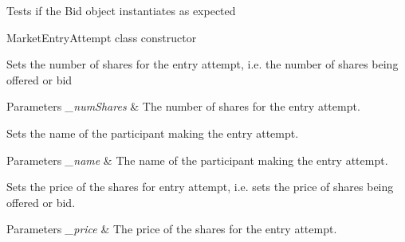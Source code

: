 
\begin{DoxyRefList}
\item[\label{todo__todo000005}%
\hypertarget{todo__todo000005}{}%
Member \hyperlink{class_bid_unit_test_a00b30251528b2203d6d9f17c321bc499}{Bid\+Unit\+Test.instantiation} ()]Tests if the Bid object instantiates as expected  
\item[\label{todo__todo000001}%
\hypertarget{todo__todo000001}{}%
Member \hyperlink{classfinancialmarketsimulator_1_1_market_entry_attempt_a9b2f8a9eef7975bc053907e2ea05c779}{financialmarketsimulator.Market\+Entry\+Attempt.Market\+Entry\+Attempt} (double pr, int num\+Shares, String name)]Market\+Entry\+Attempt class constructor 
\item[\label{todo__todo000003}%
\hypertarget{todo__todo000003}{}%
Member \hyperlink{classfinancialmarketsimulator_1_1_market_entry_attempt_a27476573fd4a0aa03270c648500a3c98}{financialmarketsimulator.Market\+Entry\+Attempt.set\+Number\+Of\+Shares} (int \+\_\+num\+Shares)]Sets the number of shares for the entry attempt, i.\+e. the number of shares being offered or bid 
\begin{DoxyParams}{Parameters}
{\em \+\_\+num\+Shares} & The number of shares for the entry attempt.  \\
\hline
\end{DoxyParams}

\item[\label{todo__todo000004}%
\hypertarget{todo__todo000004}{}%
Member \hyperlink{classfinancialmarketsimulator_1_1_market_entry_attempt_af2b5d63e0ac8d2e39cf474e128739c8a}{financialmarketsimulator.Market\+Entry\+Attempt.set\+Participant\+Name} (String \+\_\+name)]Sets the name of the participant making the entry attempt. 
\begin{DoxyParams}{Parameters}
{\em \+\_\+name} & The name of the participant making the entry attempt.  \\
\hline
\end{DoxyParams}

\item[\label{todo__todo000002}%
\hypertarget{todo__todo000002}{}%
Member \hyperlink{classfinancialmarketsimulator_1_1_market_entry_attempt_ac350f88eed14da376cb58aa920df2f38}{financialmarketsimulator.Market\+Entry\+Attempt.set\+Price} (double \+\_\+price)]Sets the price of the shares for entry attempt, i.\+e. sets the price of shares being offered or bid. 
\begin{DoxyParams}{Parameters}
{\em \+\_\+price} & The price of the shares for the entry attempt.  \\
\hline
\end{DoxyParams}


\end{DoxyRefList}
